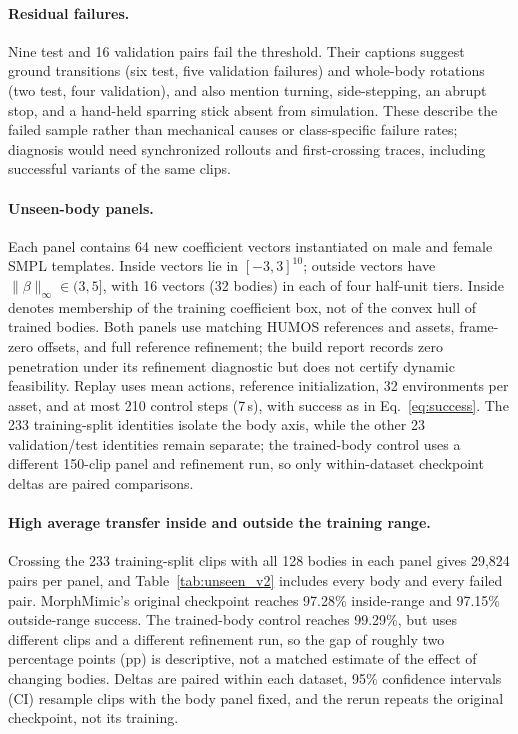 \paragraph{Residual failures.}\label{sec:failures}
Nine test and 16 validation pairs fail the threshold. Their captions suggest
ground transitions (six test, five validation failures) and whole-body
rotations (two test, four validation), and also mention turning, side-stepping,
an abrupt stop, and a hand-held sparring stick absent from simulation. These
describe the failed sample rather than mechanical causes or class-specific
failure rates; diagnosis would need synchronized rollouts and first-crossing
traces, including successful variants of the same clips.

\paragraph{Unseen-body panels.}
Each panel contains 64 new coefficient vectors instantiated on male and female
SMPL templates. Inside vectors lie in $[-3,3]^{10}$; outside vectors have
$\|\beta\|_\infty\in(3,5]$, with 16 vectors (32 bodies) in each of four
half-unit tiers. Inside denotes membership of the training coefficient box, not
of the convex hull of trained bodies. Both panels use matching HUMOS references
and assets, frame-zero offsets, and full reference refinement; the build report
records zero penetration under its refinement diagnostic but does not certify
dynamic feasibility. Replay uses mean actions, reference initialization, 32
environments per asset, and at most 210 control steps (7\,s), with success as in
Eq.~\eqref{eq:success}. The 233 training-split identities isolate the body axis,
while the other 23 validation/test identities remain separate; the trained-body
control uses a different 150-clip panel and refinement run, so only
within-dataset checkpoint deltas are paired comparisons.

\paragraph{High average transfer inside and outside the training range.}
Crossing the 233 training-split clips with all 128 bodies in each panel gives
29,824 pairs per panel, and Table~\ref{tab:unseen_v2} includes every body and
every failed pair. MorphMimic's original checkpoint reaches 97.28\%
inside-range and 97.15\% outside-range success. The trained-body control reaches 99.29\%, but uses
different clips and a different refinement run, so the gap of roughly two
percentage points (pp) is descriptive, not a matched estimate of the effect of
changing bodies. Deltas are paired within each dataset, 95\% confidence
intervals (CI) resample clips
with the body panel fixed, and the rerun repeats the original checkpoint, not its
training.

